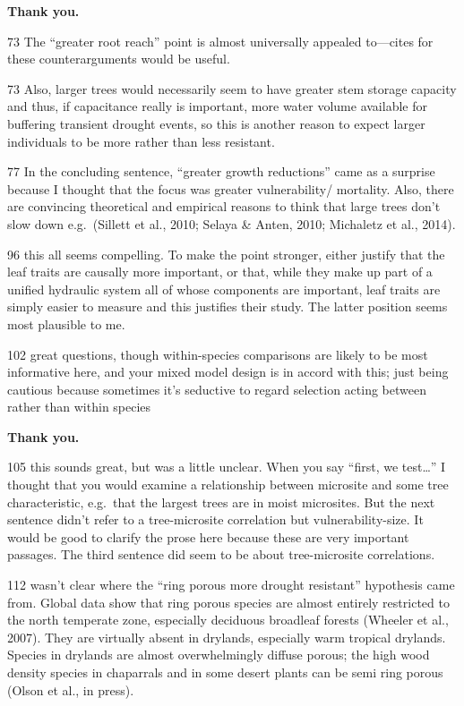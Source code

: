 \documentclass[
]{article}
\begin{document}
\textbf{Thank you.}

73 The ``greater root reach'' point is almost universally appealed
to---cites for these counterarguments would be useful.

73 Also, larger trees would necessarily seem to have greater stem
storage capacity and thus, if capacitance really is important, more
water volume available for buffering transient drought events, so this
is another reason to expect larger individuals to be more rather than
less resistant.

77 In the concluding sentence, ``greater growth reductions'' came as a
surprise because I thought that the focus was greater vulnerability/
mortality. Also, there are convincing theoretical and empirical reasons
to think that large trees don't slow down e.g.~(Sillett et al., 2010;
Selaya \& Anten, 2010; Michaletz et al., 2014).

96 this all seems compelling. To make the point stronger, either justify
that the leaf traits are causally more important, or that, while they
make up part of a unified hydraulic system all of whose components are
important, leaf traits are simply easier to measure and this justifies
their study. The latter position seems most plausible to me.

102 great questions, though within-species comparisons are likely to be
most informative here, and your mixed model design is in accord with
this; just being cautious because sometimes it's seductive to regard
selection acting between rather than within species

\textbf{Thank you.}

105 this sounds great, but was a little unclear. When you say ``first,
we test\ldots{}'' I thought that you would examine a relationship
between microsite and some tree characteristic, e.g.~that the largest
trees are in moist microsites. But the next sentence didn't refer to a
tree-microsite correlation but vulnerability-size. It would be good to
clarify the prose here because these are very important passages. The
third sentence did seem to be about tree-microsite correlations.

112 wasn't clear where the ``ring porous more drought resistant''
hypothesis came from. Global data show that ring porous species are
almost entirely restricted to the north temperate zone, especially
deciduous broadleaf forests (Wheeler et al., 2007). They are virtually
absent in drylands, especially warm tropical drylands. Species in
drylands are almost overwhelmingly diffuse porous; the high wood density
species in chaparrals and in some desert plants can be semi ring porous
(Olson et al., in press).
\end{document}

